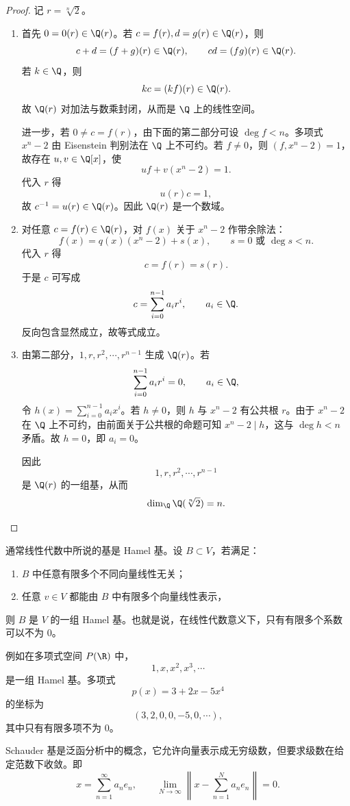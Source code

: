 \begin{proof}
	记 $r=\sqrt[n]{2}$。
	\begin{enumerate}
		\item 首先 $0=0(r)\in\Q(r)$。若 $c=f(r),d=g(r)\in\Q(r)$，则
		\[
		c+d=(f+g)(r)\in\Q(r),
		\qquad
		cd=(fg)(r)\in\Q(r).
		\]
		若 $k\in\Q$，则
		\[
		kc=(kf)(r)\in\Q(r).
		\]
		故 $\Q(r)$ 对加法与数乘封闭，从而是 $\Q$ 上的线性空间。
		
		进一步，若 $0\neq c=f(r)$，由下面的第二部分可设 $\deg f<n$。多项式 $x^n-2$ 由 Eisenstein 判别法在 $\Q$ 上不可约。若 $f\neq 0$，则 $(f,x^n-2)=1$，故存在 $u,v\in\Q[x]$，使
		\[
		uf+v(x^n-2)=1.
		\]
		代入 $r$ 得
		\[
		u(r)c=1,
		\]
		故 $c^{-1}=u(r)\in\Q(r)$。因此 $\Q(r)$ 是一个数域。
		
		\item 对任意 $c=f(r)\in\Q(r)$，对 $f(x)$ 关于 $x^n-2$ 作带余除法：
		\[
		f(x)=q(x)(x^n-2)+s(x),
		\qquad s=0\text{ 或 }\deg s<n.
		\]
		代入 $r$ 得
		\[
		c=f(r)=s(r).
		\]
		于是 $c$ 可写成
		\[
		c=\sum_{i=0}^{n-1}a_ir^i,
		\qquad a_i\in\Q.
		\]
		反向包含显然成立，故等式成立。
		
		\item 由第二部分，$1,r,r^2,\cdots,r^{n-1}$ 生成 $\Q(r)$。若
		\[
		\sum_{i=0}^{n-1}a_ir^i=0,
		\qquad a_i\in\Q,
		\]
		令 $h(x)=\sum_{i=0}^{n-1}a_ix^i$。若 $h\neq0$，则 $h$ 与 $x^n-2$ 有公共根 $r$。由于 $x^n-2$ 在 $\Q$ 上不可约，由前面关于公共根的命题可知 $x^n-2\mid h$，这与 $\deg h<n$ 矛盾。故 $h=0$，即 $a_i=0$。
		
		因此
		\[
		1,r,r^2,\cdots,r^{n-1}
		\]
		是 $\Q(r)$ 的一组基，从而
		\[
		\dim_{\Q}\Q(\sqrt[n]{2})=n.
		\]
	\end{enumerate}
\end{proof}

\begin{definition}\label{p1:concept:c4-l3090}
	通常线性代数中所说的基是 Hamel 基。设 $B\subset V$，若满足：
	\begin{enumerate}
		\item $B$ 中任意有限多个不同向量线性无关；
		\item 任意 $v\in V$ 都能由 $B$ 中有限多个向量线性表示，
	\end{enumerate}
	则 $B$ 是 $V$ 的一组 Hamel 基。也就是说，在线性代数意义下，只有有限多个系数可以不为 $0$。
\end{definition}

	
	例如在多项式空间 $P(\R)$ 中，
	\[
	1,x,x^2,x^3,\cdots
	\]
	是一组 Hamel 基。多项式
	\[
	p(x)=3+2x-5x^4
	\]
	的坐标为
	\[
	(3,2,0,0,-5,0,\cdots),
	\]
	其中只有有限多项不为 $0$。
	\begin{definition}\label{p1:concept:c4-l3113}
			Schauder 基是泛函分析中的概念，它允许向量表示成无穷级数，但要求级数在给定范数下收敛。即
		\[
		x=\sum_{n=1}^{\infty}a_ne_n,
		\qquad
		\lim_{N\to\infty}\left\|x-\sum_{n=1}^{N}a_ne_n\right\|=0.
		\]
	\end{definition}

